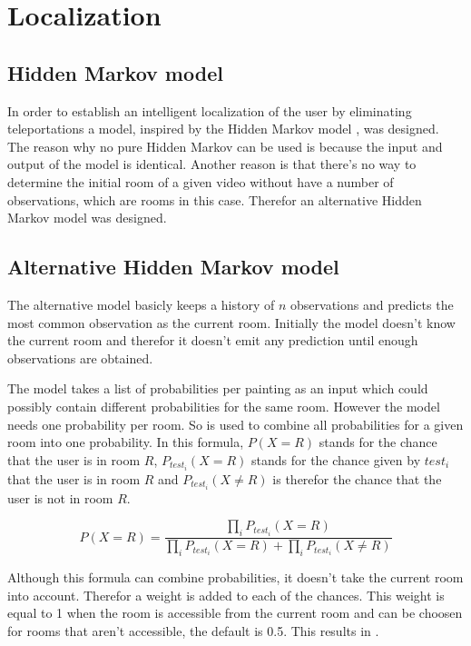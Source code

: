 \section{Localization}
\label{sec:localization}

\subsection{Hidden Markov model}
\label{subsec:hidden-markov}

In order to establish an intelligent localization of the user by eliminating teleportations a model, inspired by the Hidden Markov model \cite{eddy1996hidden}, was designed. The reason why no pure Hidden Markov can be used is because the input and output of the model is identical. Another reason is that there's no way to determine the initial room of a given video without have a number of observations, which are rooms in this case. Therefor an alternative Hidden Markov model was designed.

\subsection{Alternative Hidden Markov model}
\label{subsec:alternative-hidden-markov}

The alternative model basicly keeps a history of $n$ observations and predicts the most common observation as the current room. Initially the model doesn't know the current room and therefor it doesn't emit any prediction until enough observations are obtained.

The model takes a list of probabilities per painting as an input which could possibly contain different probabilities for the same room. However the model needs one probability per room. So  \cite{genest1986combining} is used to combine all probabilities for a given room into one probability. In this formula, $P(X = R)$ stands for the chance that the user is in room $R$, $P_{test_i}(X = R)$ stands for the chance given by $test_i$ that the user is in room $R$ and $P_{test_i}(X \ne R)$ is therefor the chance that the user is not in room $R$.

\begin{equation}
    \label{eq:combine-chances}
    P(X = R) = \frac{\prod_{i} P_{test_i}(X = R)}{\prod_{i} P_{test_i}(X = R) + \prod_{i} P_{test_i}(X \ne R)}
\end{equation}

Although this formula can combine probabilities, it doesn't take the current room into account. Therefor a weight is added to each of the chances. This weight is equal to 1 when the room is accessible from the current room and can be choosen for rooms that aren't accessible, the default is 0.5. This results in .

